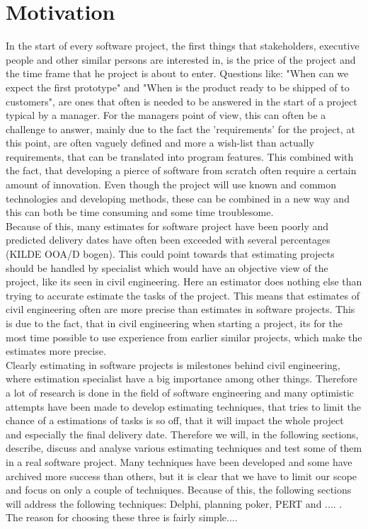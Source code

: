 \section{Motivation}
In the start of every software project, the first things that stakeholders, executive people and other similar persons are interested in, is the price of the project and the time frame that he project is about to enter. Questions like: "When can we expect the first prototype" and "When is the product ready to be shipped of to customers", are ones that often is needed to be answered in the start of a project typical by a manager. For the managers point of view, this can often be a challenge to answer, mainly due to the fact the 'requirements' for the project, at this point, are often vaguely defined and more a wish-list than actually requirements, that can be translated into program features. This combined with the fact, that developing a pierce of software from scratch often require a certain amount of innovation. Even though the project  will use known and common technologies and developing methods, these can be combined in a new way and this can both be time consuming and some time troublesome. \\
Because of this, many estimates for software project have been poorly and predicted delivery dates have often been exceeded with several percentages (KILDE OOA/D bogen). This could point towards that estimating projects should be handled by specialist which would have an objective view of the project, like its seen in civil engineering. Here an estimator does nothing else than trying to accurate estimate the tasks of the project. This means that estimates of civil engineering often are more precise than estimates in software projects. This is due to the fact, that in civil engineering when starting a project, its for the most time possible to use experience from earlier similar projects, which make the estimates more precise. \\
Clearly estimating in software projects is milestones behind civil engineering, where estimation specialist have a big importance among other things. Therefore a lot of research is done in the field of software engineering and many optimistic attempts have been made to develop estimating techniques, that tries to limit the chance of a estimations of tasks is so off, that it will impact the whole project and especially the final delivery date. 
Therefore we will, in the following sections, describe, discuss and analyse various estimating techniques and test some of them in a real software project. Many techniques have been developed and some have archived more success than others, but it is clear that we have to limit our scope and focus on only a couple of techniques. Because of this, the following sections will address the following techniques: Delphi, planning poker, PERT and .... . \\
The reason for choosing these three is fairly simple....

